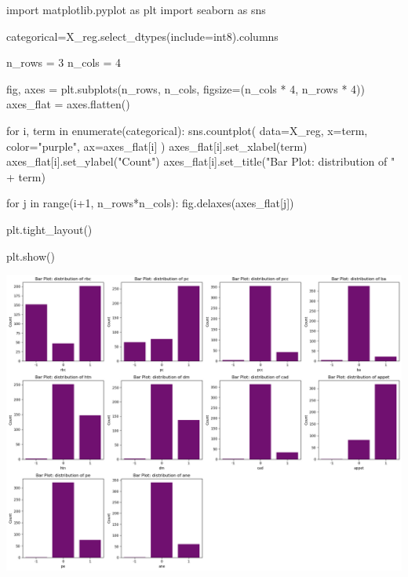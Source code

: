\documentclass[
  11pt,
  letterpaper,
  DIV=11,
  numbers=noendperiod]{scrartcl}
\newenvironment{Shaded}{\begin{snugshade}}{\end{snugshade}}
\newcommand{\BuiltInTok}[1]{\textcolor[rgb]{0.00,0.23,0.31}{#1}}
\newcommand{\ControlFlowTok}[1]{\textcolor[rgb]{0.00,0.23,0.31}{#1}}
\newcommand{\DecValTok}[1]{\textcolor[rgb]{0.68,0.00,0.00}{#1}}
\newcommand{\ImportTok}[1]{\textcolor[rgb]{0.00,0.46,0.62}{#1}}
\newcommand{\KeywordTok}[1]{\textcolor[rgb]{0.00,0.23,0.31}{#1}}
\newcommand{\NormalTok}[1]{\textcolor[rgb]{0.00,0.23,0.31}{#1}}
\newcommand{\OperatorTok}[1]{\textcolor[rgb]{0.37,0.37,0.37}{#1}}
\newcommand{\StringTok}[1]{\textcolor[rgb]{0.13,0.47,0.30}{#1}}
\begin{document}
\begin{Shaded}
\begin{Highlighting}[]
\ImportTok{import}\NormalTok{ matplotlib.pyplot }\ImportTok{as}\NormalTok{ plt}
\ImportTok{import}\NormalTok{ seaborn }\ImportTok{as}\NormalTok{ sns}

\NormalTok{categorical}\OperatorTok{=}\NormalTok{X\_reg.select\_dtypes(include}\OperatorTok{=}\StringTok{\textquotesingle{}int8\textquotesingle{}}\NormalTok{).columns}

\NormalTok{n\_rows }\OperatorTok{=} \DecValTok{3}
\NormalTok{n\_cols }\OperatorTok{=} \DecValTok{4}

\NormalTok{fig, axes }\OperatorTok{=}\NormalTok{ plt.subplots(n\_rows, n\_cols, figsize}\OperatorTok{=}\NormalTok{(n\_cols }\OperatorTok{*} \DecValTok{4}\NormalTok{, n\_rows }\OperatorTok{*} \DecValTok{4}\NormalTok{))}
\NormalTok{axes\_flat }\OperatorTok{=}\NormalTok{ axes.flatten()}

\ControlFlowTok{for}\NormalTok{ i, term }\KeywordTok{in} \BuiltInTok{enumerate}\NormalTok{(categorical):}
\NormalTok{    sns.countplot(}
\NormalTok{        data}\OperatorTok{=}\NormalTok{X\_reg,}
\NormalTok{        x}\OperatorTok{=}\NormalTok{term,}
\NormalTok{        color}\OperatorTok{=}\StringTok{"purple"}\NormalTok{,}
\NormalTok{        ax}\OperatorTok{=}\NormalTok{axes\_flat[i] }
\NormalTok{    )}
\NormalTok{    axes\_flat[i].set\_xlabel(term)}
\NormalTok{    axes\_flat[i].set\_ylabel(}\StringTok{"Count"}\NormalTok{)}
\NormalTok{    axes\_flat[i].set\_title(}\StringTok{"Bar Plot: distribution of "} \OperatorTok{+}\NormalTok{ term)}

\ControlFlowTok{for}\NormalTok{ j }\KeywordTok{in} \BuiltInTok{range}\NormalTok{(i}\OperatorTok{+}\DecValTok{1}\NormalTok{, n\_rows}\OperatorTok{*}\NormalTok{n\_cols):}
\NormalTok{    fig.delaxes(axes\_flat[j])}

\NormalTok{plt.tight\_layout()}

\NormalTok{plt.show()}
\end{Highlighting}
\end{Shaded}

\includegraphics{assignment6111_files/figure-pdf/cell-19-output-1.png}
\end{document}
